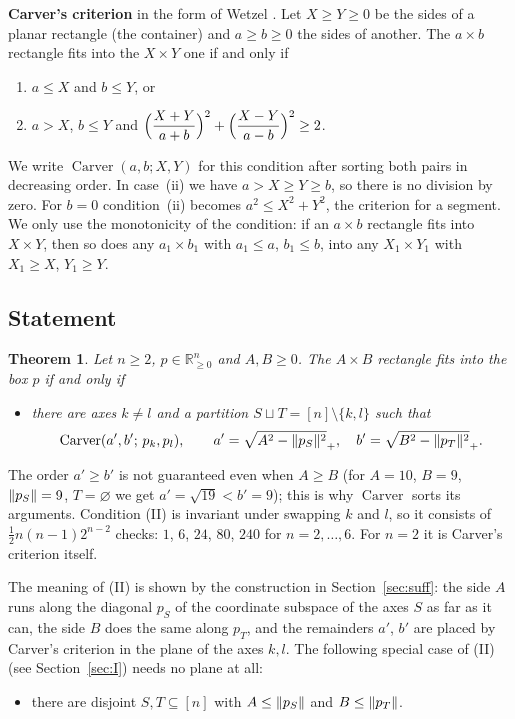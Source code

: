 \documentclass[11pt]{article}
\newtheorem{theorem}{Theorem}[section]
\theoremstyle{definition}
\theoremstyle{remark}
\newcommand{\R}{\mathbb{R}}
\newcommand{\Carver}{\operatorname{Carver}}
\DeclarePairedDelimiter{\norm}{\lVert}{\rVert}
\begin{document}
\medskip\noindent\textbf{Carver's criterion} \cite{Carver1957} in the form of Wetzel \cite[Theorem~1]{Wetzel2000}.
Let $X\ge Y\ge0$ be the sides of a planar rectangle (the container) and $a\ge b\ge0$ the sides of
another. The $a\times b$ rectangle fits into the $X\times Y$ one if and only if
\begin{enumerate}
\item[(i)] $a\le X$ and $b\le Y$, or
\item[(ii)] $a>X$, $b\le Y$ and $\displaystyle\Bigl(\frac{X+Y}{a+b}\Bigr)^2+\Bigl(\frac{X-Y}{a-b}\Bigr)^2\ge2$.
\end{enumerate}
We write $\Carver(a,b;X,Y)$ for this condition after sorting both pairs in decreasing order. In
case~(ii) we have $a>X\ge Y\ge b$, so there is no division by zero. For $b=0$ condition~(ii) becomes
$a^2\le X^2+Y^2$, the criterion for a segment. We only use the monotonicity of the condition: if an
$a\times b$ rectangle fits into $X\times Y$, then so does any $a_1\times b_1$ with $a_1\le a$,
$b_1\le b$, into any $X_1\times Y_1$ with $X_1\ge X$, $Y_1\ge Y$.

\subsection{Statement}

\begin{theorem}\label{thm:main}
Let $n\ge2$, $p\in\R^n_{\ge0}$ and $A,B\ge0$. The $A\times B$ rectangle fits into the box $p$ if and
only if
\begin{itemize}
\item[\textbf{(II)}] there are axes $k\ne l$ and a partition $S\sqcup T=[n]\setminus\{k,l\}$ such that
\[
\Carver(a',b';\,p_k,p_l),\qquad a'=\sqrt{A^2-\norm{p_S}^2}_+,\quad b'=\sqrt{B^2-\norm{p_T}^2}_+ .
\]
\end{itemize}
\end{theorem}

The order $a'\ge b'$ is not guaranteed even when $A\ge B$ (for $A=10$, $B=9$, $\norm{p_S}=9$, $T=\varnothing$
we get $a'=\sqrt{19}<b'=9$); this is why $\Carver$ sorts its arguments. Condition (II) is invariant
under swapping $k$ and $l$, so it consists of $\tfrac12 n(n-1)2^{n-2}$ checks: $1$, $6$, $24$, $80$, $240$
for $n=2,\dots,6$. For $n=2$ it is Carver's criterion itself.

The meaning of (II) is shown by the construction in Section~\ref{sec:suff}: the side $A$ runs along the
diagonal $p_S$ of the coordinate subspace of the axes $S$ as far as it can, the side $B$ does the same
along $p_T$, and the remainders $a'$, $b'$ are placed by Carver's criterion in the plane of the axes
$k,l$. The following special case of (II) (see Section~\ref{sec:I}) needs no plane at all:
\begin{itemize}
\item[\textbf{(I)}] there are disjoint $S,T\subseteq[n]$ with $A\le\norm{p_S}$ and $B\le\norm{p_T}$.
\end{itemize}
\end{document}
